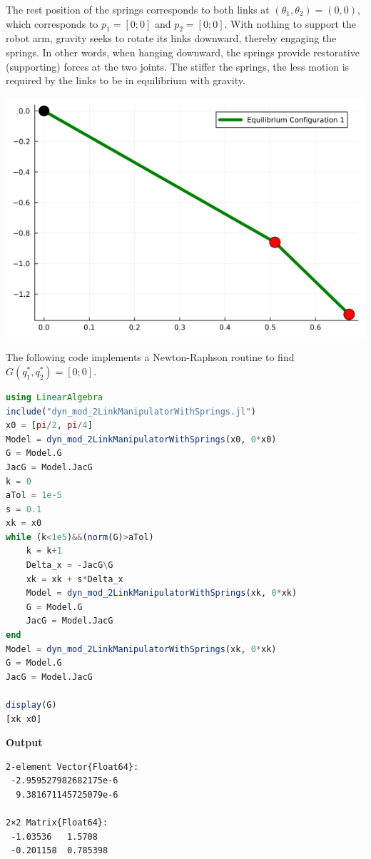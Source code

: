 The rest position of the springs corresponds to both links at $(\theta_1, \theta_2) = (0,0)$, which corresponds to $p_1=[0; 0]$ and $p_2 = [0; 0]$. With nothing to support the robot arm, gravity seeks to rotate its links downward, thereby engaging the springs. In other words, when hanging downward, the springs provide restorative (supporting) forces at the two joints. The stiffer the springs, the less motion is required by the links to be in equilibrium with gravity.

      \begin{center}
    \includegraphics[width=0.45\columnwidth]{graphics/Chap09/EquilibriumWithSprings.png}
    \end{center}
\bigskip
The following code implements a Newton-Raphson routine to find $G(q_1^\ast, q_2^\ast) = [0; 0]$.
\bigskip

\begin{lstlisting}[language=Julia,style=mystyle]
using LinearAlgebra
include("dyn_mod_2LinkManipulatorWithSprings.jl") 
x0 = [pi/2, pi/4] 
Model = dyn_mod_2LinkManipulatorWithSprings(x0, 0*x0)
G = Model.G
JacG = Model.JacG
k = 0
aTol = 1e-5
s = 0.1
xk = x0
while (k<1e5)&&(norm(G)>aTol)
    k = k+1
    Delta_x = -JacG\G
    xk = xk + s*Delta_x
    Model = dyn_mod_2LinkManipulatorWithSprings(xk, 0*xk)
    G = Model.G
    JacG = Model.JacG
end
Model = dyn_mod_2LinkManipulatorWithSprings(xk, 0*xk)
G = Model.G
JacG = Model.JacG

display(G)
[xk x0] 
\end{lstlisting}
\textbf{Output} 
\begin{verbatim}
2-element Vector{Float64}:
 -2.959527982682175e-6
  9.381671145725079e-6
  
2×2 Matrix{Float64}:
 -1.03536   1.5708
 -0.201158  0.785398
\end{verbatim}



